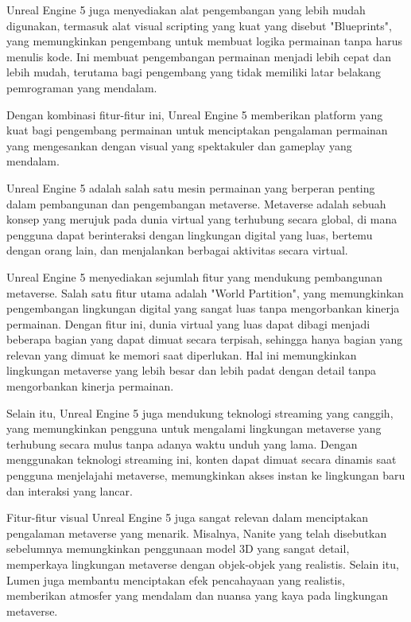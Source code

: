 Unreal Engine 5 juga menyediakan alat pengembangan yang lebih mudah digunakan, termasuk alat visual scripting yang kuat yang disebut "Blueprints", yang memungkinkan pengembang untuk membuat logika permainan tanpa harus menulis kode.
Ini membuat pengembangan permainan menjadi lebih cepat dan lebih mudah, terutama bagi pengembang yang tidak memiliki latar belakang pemrograman yang mendalam.

Dengan kombinasi fitur-fitur ini, Unreal Engine 5 memberikan platform yang kuat bagi pengembang permainan untuk menciptakan pengalaman permainan yang mengesankan dengan visual yang spektakuler dan gameplay yang mendalam. \parencite{unrealengine}

Unreal Engine 5 adalah salah satu mesin permainan yang berperan penting dalam pembangunan dan pengembangan metaverse. Metaverse adalah sebuah konsep yang merujuk pada dunia virtual yang terhubung secara global,
di mana pengguna dapat berinteraksi dengan lingkungan digital yang luas, bertemu dengan orang lain, dan menjalankan berbagai aktivitas secara virtual.

Unreal Engine 5 menyediakan sejumlah fitur yang mendukung pembangunan metaverse. Salah satu fitur utama adalah "World Partition", yang memungkinkan pengembangan lingkungan digital yang sangat luas tanpa mengorbankan kinerja permainan.
Dengan fitur ini, dunia virtual yang luas dapat dibagi menjadi beberapa bagian yang dapat dimuat secara terpisah, sehingga hanya bagian yang relevan yang dimuat ke memori saat diperlukan. Hal ini memungkinkan lingkungan metaverse yang
lebih besar dan lebih padat dengan detail tanpa mengorbankan kinerja permainan.

Selain itu, Unreal Engine 5 juga mendukung teknologi streaming yang canggih, yang memungkinkan pengguna untuk mengalami lingkungan metaverse yang terhubung secara mulus tanpa adanya waktu unduh yang lama. Dengan menggunakan teknologi
streaming ini, konten dapat dimuat secara dinamis saat pengguna menjelajahi metaverse, memungkinkan akses instan ke lingkungan baru dan interaksi yang lancar.

Fitur-fitur visual Unreal Engine 5 juga sangat relevan dalam menciptakan pengalaman metaverse yang menarik. Misalnya, Nanite yang telah disebutkan sebelumnya memungkinkan penggunaan model 3D yang sangat detail, memperkaya lingkungan
metaverse dengan objek-objek yang realistis. Selain itu, Lumen juga membantu menciptakan efek pencahayaan yang realistis, memberikan atmosfer yang mendalam dan nuansa yang kaya pada lingkungan metaverse.

